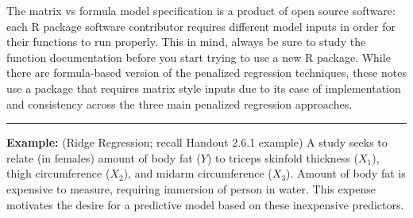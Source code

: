 \documentclass{article}\usepackage[]{graphicx}\usepackage[]{color}
\begin{document}
The matrix vs formula model specification is a product of open source software: each R package software contributor requires different model inputs in order for their functions to run properly. This in mind, always be sure to study the function documentation before you start trying to use a new R package. While there are formula-based version of the penalized regression techniques, these notes use a package that requires matrix style inputs due to its ease of implementation and consistency across the three main penalized regression approaches. 

\medskip
\hrule
\medskip

\textbf{Example: } (Ridge Regression; recall Handout 2.6.1 example) A study seeks to relate (in females) amount of body fat ($Y$) to triceps skinfold thickness ($X_1$), thigh circumference ($X_2$), and midarm circumference ($X_3$).  Amount of body fat is expensive to measure, requiring immersion of person in water.  This expense motivates the desire for a predictive model based on these inexpensive predictors.
\end{document}
